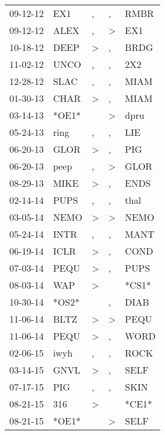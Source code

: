 \begin{supertabular}{lllll}
 09-12-12 &    EX1 &             , &                , &   RMBR \\
 09-12-12 &   ALEX &             , &     \textgreater &    EX1 \\
 10-18-12 &   DEEP &  \textgreater &                , &   BRDG \\
 11-02-12 &   UNCO &             , &                , &    2X2 \\
 12-28-12 &   SLAC &             , &                , &   MIAM \\
 01-30-13 &   CHAR &  \textgreater &                , &   MIAM \\
 03-14-13 &  *OE1* &               &     \textgreater &   dpru \\
 05-24-13 &   ring &             , &                , &    LIE \\
 06-20-13 &   GLOR &  \textgreater &                , &    PIG \\
 06-20-13 &   peep &             , &     \textgreater &   GLOR \\
 08-29-13 &   MIKE &  \textgreater &                , &   ENDS \\
 02-14-14 &   PUPS &             , &                , &   thal \\
 03-05-14 &   NEMO &  \textgreater &     \textgreater &   NEMO \\
 05-24-14 &   INTR &             , &                , &   MANT \\
 06-19-14 &   ICLR &  \textgreater &                , &   COND \\
 07-03-14 &   PEQU &  \textgreater &                , &   PUPS \\
 08-03-14 &    WAP &  \textgreater &                  &  *CS1* \\
 10-30-14 &  *OS2* &               &                , &   DIAB \\
 11-06-14 &   BLTZ &  \textgreater &     \textgreater &   PEQU \\
 11-06-14 &   PEQU &  \textgreater &                , &   WORD \\
 02-06-15 &   iwyh &             , &                , &   ROCK \\
 03-14-15 &   GNVL &  \textgreater &                , &   SELF \\
 07-17-15 &    PIG &             , &                , &   SKIN \\
 08-21-15 &    316 &  \textgreater &                  &  *CE1* \\
 08-21-15 &  *OE1* &               &     \textgreater &   SELF \\

\end{supertabular}
